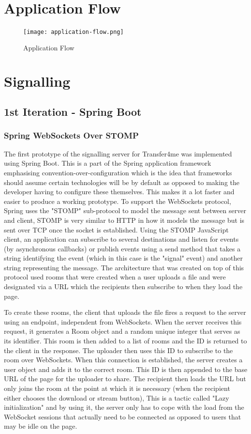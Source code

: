\documentclass[]{report}
\begin{document}
		\section{Application Flow}
		\begin{figure}[H]
			\caption{Application Flow}
			\centering
			\texttt{[image: application-flow.png]}
		\end{figure}
		
		\section{Signalling}
			\subsection{1st Iteration - Spring Boot}
				\subsubsection*{Spring WebSockets Over STOMP}
				The first prototype of the signalling server for Transfer4me was implemented using Spring Boot. This is a part of the Spring application framework emphasising convention-over-configuration which is the idea that frameworks should assume certain technologies will be by default as opposed to making the developer having to configure these themselves. This makes it a lot faster and easier to produce a working prototype. To support the WebSockets protocol, Spring uses the "STOMP" sub-protocol to model the message sent between server and client, STOMP is very similar to HTTP in how it models the message but is sent over TCP once the socket is established. Using the STOMP JavaScript client, an application can subscribe to several destinations and listen for events (by asynchronous callbacks) or publish events using a send method that takes a string identifying the event (which in this case is the "signal" event) and another string representing the message. The architecture that was created on top of this protocol used rooms that were created when a user uploads a file and were designated via a URL which the recipients then subscribe to when they load the page.

				To create these rooms, the client that uploads the file fires a request to the server using an endpoint, independent from WebSockets. When the server receives this request, it generates a Room object and a random unique integer that serves as its identifier. This room is then added to a list of rooms and the ID is returned to the client in the response. The uploader then uses this ID to subscribe to the room over WebSockets. When this connection is established, the server creates a user object and adds it to the correct room. This ID is then appended to the base URL of the page for the uploader to share. The recipient then loads the URL but only joins the room at the point at which it is necessary (when the recipient either chooses the download or stream button), This is a tactic called "Lazy initialization" and by using it, the server only has to cope with the load from the WebSocket sessions that actually need to be connected as opposed to users that may be idle on the page.
							
\end{document}
